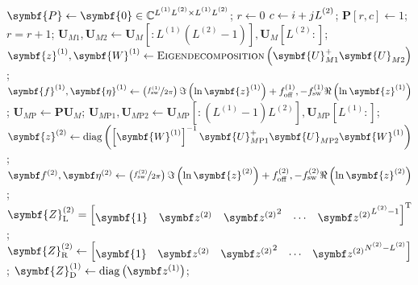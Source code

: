\begin{algorithm}
\begin{algorithmic}[1]
        \State $\symbf{P} \gets \symbf{0} \in \mathbb{C}^{\Lone \Ltwo \times \Lone \Ltwo}$;
        \State $r \gets 0$
                \State $c \gets i + j \Ltwo$;
                \State $\symbf{P}\left[r, c\right] \gets 1$;
                \State $r = r + 1$;
            \EndFor
        \EndFor
        \State $\symbf{U}_{M1}, \symbf{U}_{M2} \gets \symbf{U}_M\left[ : L^{(1)}(L^{(2)}-1)\right], \symbf{U}_M\left[L^{(2)}:\right]$;
        \State $\symbf{z}^{(1)}, \symbf{W}^{(1)} \gets \textsc{Eigendecomposition}\left( \symbf{U}_{M1}^+ \symbf{U}_{M2}^{\vphantom{+}} \right)$;
        \State $
            \symbf{f}^{(1)},
            \symbf{\eta}^{(1)} \gets
            \left(
                \nicefrac{f_{\text{sw}}^{(1)}}{2 \pi}
            \right)
            \Im \left( \ln \symbf{z}^{(1)} \right) + \foffone,
            -\fswone \Re \left( \ln \symbf{z}^{(1)} \right)
        $;
        \State $\symbf{U}_{M\text{P}} \gets \symbf{P} \symbf{U}_M$;
        \State $
            \symbf{U}_{M\text{P}1},
            \symbf{U}_{M \text{P} 2} \gets
            \symbf{U}_{M \text{P}}\left[ : (L^{(1)}-1)L^{(2)}\right],
            \symbf{U}_{M \text{P}}\left[L^{(1)}:\right]
        $;
        \State $
            \symbf{z}^{(2)} \gets \operatorname{diag} \left(
                \left[\symbf{W}^{(1)}\right]^{-1}
                \symbf{U}_{M\text{P}1}^{+}
                \symbf{U}_{M\text{P}2}^{\vphantom{+}}
                \symbf{W}^{(1)}
            \right)$;
        \State $
            \bdftwo,
            \bdetatwo \gets
            \left(
                \nicefrac{\fswtwo}{2 \pi}
            \right)
            \Im \left( \ln \symbf{z}^{(2)} \right) + \fofftwo,
            -\fswtwo \Re \left( \ln \symbf{z}^{(2)} \right)
        $;
        \State $
        \symbf{Z}^{(2)}_{\text{L}} =
        \begin{bmatrix}
            \symbf{1} &
            \bdztwo &
            {\bdztwo}^2 &
            \cdots &
            {\bdztwo}^{\Ltwo-1}
        \end{bmatrix}\T
        $;
        \State $
            \symbf{Z}^{(2)}_{\text{R}} \gets
            \begin{bmatrix}
                \symbf{1} & \bdztwo & {\bdztwo}^2 & \cdots & {\bdztwo}^{\Ntwo - \Ltwo}
            \end{bmatrix}
        $;
        \State $\symbf{Z}^{(1)}_{\text{D}} \gets \diag\left(\bdzone\right)$;

\end{algorithmic}
\end{algorithm}
